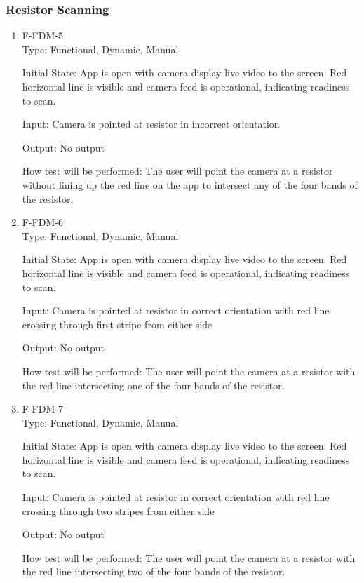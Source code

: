 \documentclass[12pt, titlepage]{article}
\begin{document}
\subsubsection{Resistor Scanning}
\begin{enumerate}
\item{F-FDM-5\\}
Type: Functional, Dynamic, Manual
					
Initial State: 
App is open with camera display live video to the screen. Red horizontal line is visible and camera feed is operational, indicating readiness to scan.
					
Input: 
Camera is pointed at resistor in incorrect orientation
					
Output: 
No output
					
How test will be performed: 
The user will point the camera at a resistor without lining up the red line on the app to intersect any of the four bands of the resistor.
					
\item{F-FDM-6\\}
Type: Functional, Dynamic, Manual
					
Initial State: 
App is open with camera display live video to the screen. Red horizontal line is visible and camera feed is operational, indicating readiness to scan.
					
Input: 
Camera is pointed at resistor in correct orientation with red line crossing through first stripe from either side
					
Output: 
No output

How test will be performed: 
The user will point the camera at a resistor with the red line intersecting one of the four bands of the resistor.

\item{F-FDM-7\\}
Type: Functional, Dynamic, Manual
					
Initial State: 
App is open with camera display live video to the screen. Red horizontal line is visible and camera feed is operational, indicating readiness to scan.
					
Input: 
Camera is pointed at resistor in correct orientation with red line crossing through two stripes from either side
					
Output: 
No output	

How test will be performed: 
The user will point the camera at a resistor with the red line intersecting two of the four bands of the resistor.


\end{enumerate}
\end{document}
